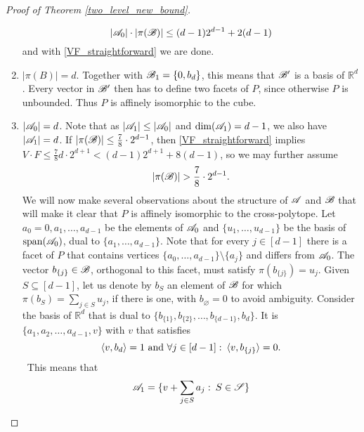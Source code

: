 \begin{proof}[Proof of Theorem \ref{two_level_new_bound}]
\begin{enumerate}
        \[\left|{\mathscr{A}}_0\right|\cdot\left|\pi({\mathscr{B}})\right| \leq (d-1)2^{d-1}+2(d-1)\]
        and with \eqref{VF_straightforward} we are done. 
        \item $\left|\pi(B)\right| = d$. Together with ${\mathscr{B}}_1=\{0,b_d\}$, this means that ${\mathscr{B}}'$ is a basis of $\mathbb{R}^d$. Every vector in ${\mathscr{B}}'$ then has to define two facets of $P$, since otherwise $P$ is unbounded. Thus $P$ is affinely isomorphic to the cube.
        \item $\left|{\mathscr{A}}_0\right| = d$. Note that as $|{\mathscr{A}}_1| \leq |{\mathscr{A}}_0|$ and $\operatorname{dim}({\mathscr{A}}_1)=d-1$, we also have $\left|{\mathscr{A}}_1\right|=d$. If $|\pi({\mathscr{B}})|\leq \frac{7}{8} \cdot 2^{d-1}$, then \eqref{VF_straightforward} implies $V \cdot F \leq \frac{7}{8} d \cdot 2^{d+1} < (d-1)2^{d+1} + 8(d-1)$, so we may further assume
        \begin{equation}\label{piBisLarge}
            |\pi({\mathscr{B}})| > \frac{7}{8} \cdot 2^{d-1}.
        \end{equation}
        We will now make several observations about the structure of ${\mathscr{A}}$ and ${\mathscr{B}}$ that will make it clear that $P$ is affinely isomorphic to the cross-polytope. Let $a_0=0, a_1, \ldots, a_{d-1}$ be the elements of ${\mathscr{A}}_0$ and $\{u_{1}, \ldots, u_{d-1}\}$ be the basis of $\operatorname{span}({\mathscr{A}}_0)$, dual to $\{a_1, \ldots, a_{d-1}\}$. Note that for every $j\in [d-1]$ there is a facet of $P$ that contains vertices $\{a_0, \ldots, a_{d-1}\}\setminus \{a_j\}$ and differs from ${\mathscr{A}}_0$. The vector $b_{\{j\}}\in {\mathscr{B}}$, orthogonal to this facet, must satisfy $\pi(b_{\{j\}})=u_j$. Given $S\subseteq [d-1]$, let us denote by $b_{S}$ an element of ${\mathscr{B}}$ for which $\pi(b_S)=\sum_{j\in S}u_j$, if there is one, with $b_{\varnothing}=0$ to avoid ambiguity. Consider the basis of $\mathbb{R}^d$ that is dual to $\{b_{\{1\}}, b_{\{2\}}, \ldots, b_{\{d-1\}}, b_d\}$. It is $\{a_1, a_2, \ldots, a_{d-1}, v\}$ with $v$ that satisfies 
        \[
            \langle v, b_d\rangle = 1\text{ and }\forall j \in [d-1]:\:\langle v, b_{\{j\}}\rangle = 0.
        \]\
        This means that 
        \begin{equation}\label{A1-representation}
            {\mathscr{A}}_1 = \{v+\sum_{j \in S}a_j:\:S\in {\mathscr{S}}\}
        \end{equation}
    

\end{enumerate}
\end{proof}
